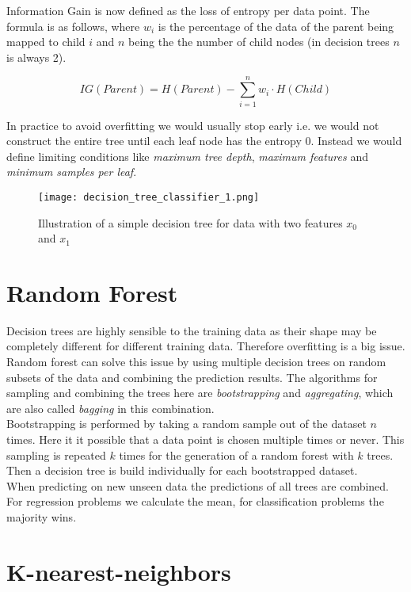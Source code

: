 Information Gain is now defined as the loss of entropy per data point. The formula is as follows, where $w_{i}$ is the percentage of the data of the parent being mapped to child $i$ and $n$ being the the number of child nodes (in decision trees $n$ is always 2).

$$
    IG(Parent) =  H(Parent) - \sum_{i=1}^{n} w_{i} \cdot H(Child)
$$

In practice to avoid overfitting we would usually stop early i.e. we would not construct the entire tree until each leaf node has the entropy 0. Instead we would define limiting conditions like \textit{maximum tree depth}, \textit{maximum features} and \textit{minimum samples per leaf}.

\begin{figure}[h]
    \centering
    \texttt{[image: decision\_tree\_classifier\_1.png]}
    \caption{Illustration of a simple decision tree for data with two features $x_{0}$ and $x_{1}$}
    \label{fig:mlp}
\end{figure}


\section{Random Forest}

Decision trees are highly sensible to the training data as their shape may be completely different for different training data. Therefore overfitting is a big issue. Random forest can solve this issue by using multiple decision trees on random subsets of the data and combining the prediction results. The algorithms for sampling and combining the trees here are \textit{bootstrapping} and \textit{aggregating}, which are also called \textit{bagging} in this combination.\\
Bootstrapping is performed by taking a random sample out of the dataset $n$ times. Here it it possible that a data point is chosen multiple times or never. This sampling is repeated $k$ times for the generation of a random forest with $k$ trees. Then a decision tree is build individually for each bootstrapped dataset.\\
When predicting on new unseen data the predictions of all trees are combined. For regression problems we calculate the mean, for classification problems the majority wins.

\section{K-nearest-neighbors}

